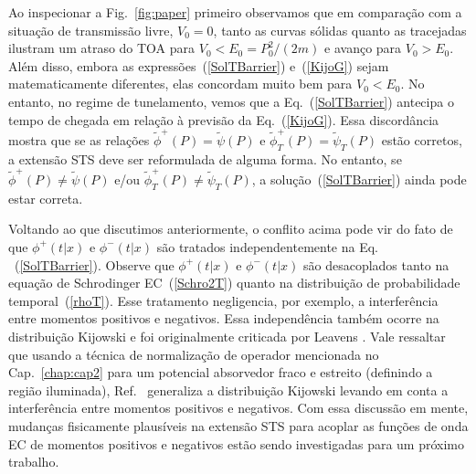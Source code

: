 Ao inspecionar a Fig.~\ref{fig:paper} primeiro observamos que em comparação com a situação de transmissão livre, $V_0=0$, tanto as curvas sólidas quanto as tracejadas ilustram um atraso do TOA para $V_0<E_0=P_0^2/(2m)$ e avanço para $V_0>E_0$. Além disso, embora as expressões~(\ref{SolTBarrier}) e~(\ref{KijoG}) sejam matematicamente diferentes, elas concordam muito bem para $V_0<E_0$. No entanto, no regime de tunelamento, vemos que a Eq.~(\ref{SolTBarrier}) antecipa o tempo de chegada em relação à previsão da Eq.~(\ref{KijoG}). Essa discordância mostra que se as relações ${\tilde \phi}^+(P)={\tilde \psi}(P)$ e ${\tilde \phi}^+_T(P)={\tilde \psi }_{T}(P)$ estão corretos, a extensão STS deve ser reformulada de alguma forma. No entanto, se ${\tilde \phi}^+(P) \neq {\tilde \psi}(P)$ e/ou ${\tilde \phi}^+_T(P) \neq {\tilde \psi }_{T}(P)$, a solução~(\ref{SolTBarrier}) ainda pode estar correta.



Voltando ao que discutimos anteriormente, o conflito acima pode vir do fato de que $\phi^+(t|x)$ e $\phi^-(t|x)$ são tratados independentemente na Eq. ~(\ref{SolTBarrier}). Observe que $\phi^+(t|x)$ e $\phi^-(t|x)$ são desacoplados tanto na equação de Schrodinger EC~(\ref{Schro2T}) quanto na distribuição de probabilidade temporal~(\ref {rhoT}). Esse tratamento negligencia, por exemplo, a interferência entre momentos positivos e negativos. Essa independência também ocorre na distribuição Kijowski e foi originalmente criticada por Leavens \cite{LeavensR}. Vale ressaltar que usando a técnica de normalização de operador mencionada no Cap.~\ref{chap:cap2} para um potencial absorvedor fraco e estreito (definindo a região iluminada), Ref.~\cite{Heger2} generaliza a distribuição Kijowski levando em conta a interferência entre momentos positivos e negativos. Com essa discussão em mente, mudanças fisicamente plausíveis na extensão STS para acoplar as funções de onda EC de momentos positivos e negativos estão sendo investigadas para um próximo trabalho. 





